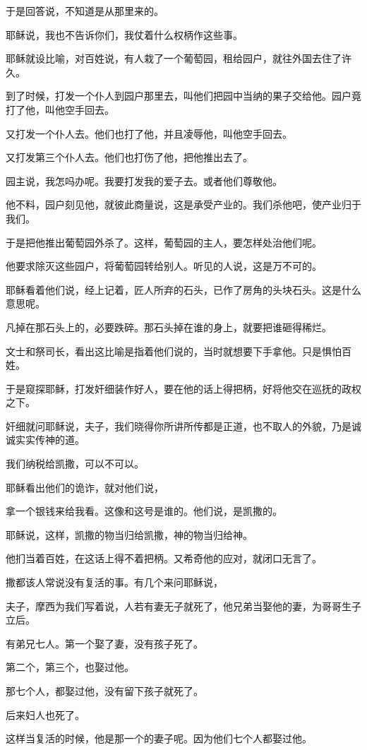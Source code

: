 \documentclass[12pt,oneside]{book}
\begin{document}
于是回答说，不知道是从那里来的。

耶稣说，我也不告诉你们，我仗着什么权柄作这些事。

耶稣就设比喻，对百姓说，有人栽了一个葡萄园，租给园户，就往外国去住了许久。

到了时候，打发一个仆人到园户那里去，叫他们把园中当纳的果子交给他。园户竟打了他，叫他空手回去。

又打发一个仆人去。他们也打了他，并且凌辱他，叫他空手回去。

又打发第三个仆人去。他们也打伤了他，把他推出去了。

园主说，我怎吗办呢。我要打发我的爱子去。或者他们尊敬他。

他不料，园户刻见他，就彼此商量说，这是承受产业的。我们杀他吧，使产业归于我们。

于是把他推出葡萄园外杀了。这样，葡萄园的主人，要怎样处治他们呢。

他要求除灭这些园户，将葡萄园转给别人。听见的人说，这是万不可的。

耶稣看着他们说，经上记着，匠人所弃的石头，已作了房角的头块石头。这是什么意思呢。

凡掉在那石头上的，必要跌碎。那石头掉在谁的身上，就要把谁砸得稀烂。

文士和祭司长，看出这比喻是指着他们说的，当时就想要下手拿他。只是惧怕百姓。

于是窥探耶稣，打发奸细装作好人，要在他的话上得把柄，好将他交在巡抚的政权之下。

奸细就问耶稣说，夫子，我们晓得你所讲所传都是正道，也不取人的外貌，乃是诚诚实实传神的道。

我们纳税给凯撒，可以不可以。

耶稣看出他们的诡诈，就对他们说，

拿一个银钱来给我看。这像和这号是谁的。他们说，是凯撒的。

耶稣说，这样，凯撒的物当归给凯撒，神的物当归给神。

他扪当着百姓，在这话上得不着把柄。又希奇他的应对，就闭口无言了。

撒都该人常说没有复活的事。有几个来问耶稣说，

夫子，摩西为我们写着说，人若有妻无子就死了，他兄弟当娶他的妻，为哥哥生子立后。

有弟兄七人。第一个娶了妻，没有孩子死了。

第二个，第三个，也娶过他。

那七个人，都娶过他，没有留下孩子就死了。

后来妇人也死了。

这样当复活的时候，他是那一个的妻子呢。因为他们七个人都娶过他。
\end{document}
